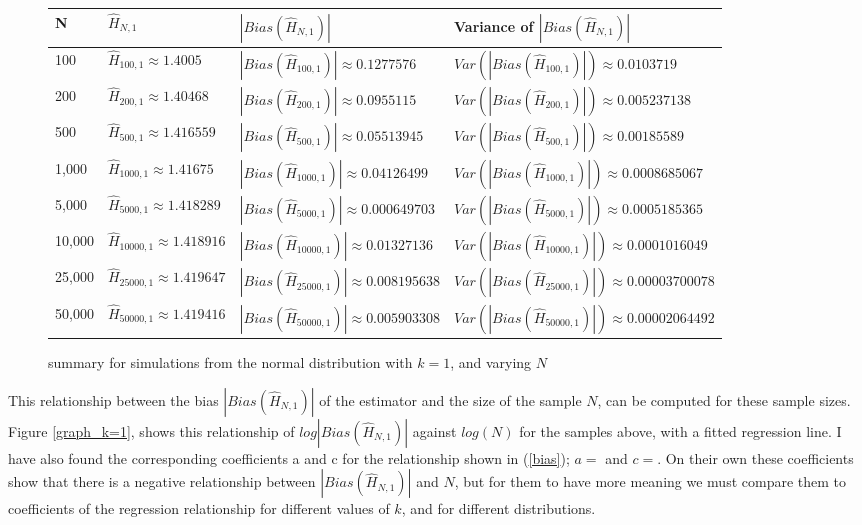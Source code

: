 \documentclass{article}
\begin{document}
\begin{figure} 
 \begin{adjustwidth}{-2cm}{}
\begin{tabular}{|l|l|l|l|}
\hline
N & $\hat{H}_{N, 1}$ & $|Bias(\hat{H}_{N, 1})|$ & Variance of $|Bias(\hat{H}_{N, 1})|$ \\
\hline
100 & $\hat{H}_{100, 1} \approx 1.4005$ & $|Bias(\hat{H}_{100, 1})| \approx 0.1277576$ & $Var(|Bias(\hat{H}_{100, 1})|) \approx 0.0103719$\\
200 & $\hat{H}_{200, 1} \approx 1.40468$ & $|Bias(\hat{H}_{200, 1})| \approx 0.0955115$ & $Var(|Bias(\hat{H}_{200, 1})|) \approx 0.005237138$\\
500 & $\hat{H}_{500, 1} \approx 1.416559$ & $|Bias(\hat{H}_{500, 1})| \approx 0.05513945$ & $Var(|Bias(\hat{H}_{500, 1})|) \approx 0.00185589$\\
1,000 & $\hat{H}_{1000, 1} \approx 1.41675$ & $|Bias(\hat{H}_{1000, 1})| \approx 0.04126499$ & $Var(|Bias(\hat{H}_{1000, 1})|) \approx 0.0008685067$\\
5,000 & $\hat{H}_{5000, 1} \approx 1.418289$ & $|Bias(\hat{H}_{5000, 1})| \approx 0.000649703$ & $Var(|Bias(\hat{H}_{5000, 1})|) \approx 0.0005185365 $\\
10,000 & $\hat{H}_{10000, 1} \approx 1.418916$ & $|Bias(\hat{H}_{10000, 1})| \approx 0.01327136$ & $Var(|Bias(\hat{H}_{10000, 1})|) \approx 0.0001016049$\\
25,000 & $\hat{H}_{25000, 1} \approx 1.419647$ & $|Bias(\hat{H}_{25000, 1})| \approx 0.008195638$ & $Var(|Bias(\hat{H}_{25000, 1})|) \approx 0.00003700078$\\
50,000 & $\hat{H}_{50000, 1} \approx 1.419416$ & $|Bias(\hat{H}_{50000, 1})| \approx 0.005903308$ & $Var(|Bias(\hat{H}_{50000, 1})|) \approx 0.00002064492$\\
\hline
\end{tabular}
\caption{\label{fig:normal_k=1} summary for simulations from the normal distribution with $k=1$, and varying $N$}
 \end{adjustwidth}
\end{figure}

This relationship between the bias $|Bias(\hat{H}_{N, 1})|$ of the estimator and the size of the sample $N$, can be computed for these sample sizes. Figure \ref{graph_k=1}, shows this relationship of $log|Bias(\hat{H}_{N, 1})|$ against $log(N)$ for the samples above, with a fitted regression line. I have also found the corresponding coefficients a and c for the relationship shown in (\ref{bias}); $a = $ and $c = $. On their own these coefficients show that there is a negative relationship between $|Bias(\hat{H}_{N, 1})|$ and $N$, but for them to have more meaning we must compare them to coefficients of the regression relationship for different values of $k$, and for different distributions.
\end{document}
